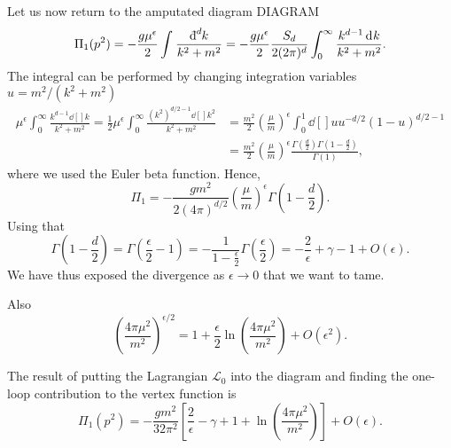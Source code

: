 Let us now return to the amputated diagram DIAGRAM
\begin{equation}
  \Pi_1(p^2) = - \frac{g \mu^\epsilon}{2} \int_{}^{}\frac{\bdd[d]{k}}{k^2+ m^2} = -\frac{g \mu^\epsilon}{2} \frac{S_d}{2 (2\pi)^d} \int_{0}^{\infty}\frac{k^{d-1} \dd[]{k}}{k^2 + m^2}.
\end{equation}
The integral can be performed by changing integration variables $u = m^2 / (k^2 + m^2)$
\begin{align}
  \mu^\epsilon \int_{0}^{\infty}\frac{k^{d-1}\dd[]{k}}{k^2 + m^2} = \frac{1}{2} \mu^\epsilon \int_{0}^{\infty}\frac{(k^2)^{d / 2-1}\dd[]{k^2}}{k^2 + m^2} &= \frac{m^2}{2} (\frac{\mu}{m})^\epsilon \int_{0}^{1}\dd[]{u} u^{-d / 2} (1-u)^{d / 2 - 1} \\
																			  &= \frac{m^2}{2} (\frac{\mu}{m})^\epsilon \frac{\Gamma(\frac{d}{2}) \Gamma(1 - \frac{d}{2})}{\Gamma(1)},
\end{align}
where we used the Euler beta function. Hence,
\begin{equation}
  \Pi_1 = -\frac{g m^2}{2 (4 \pi)^{d/2}} (\frac{\mu}{m})^\epsilon \Gamma(1 - \frac{d}{2}).
\end{equation}
Using that
\begin{equation}
  \Gamma(1- \frac{d}{2}) = \Gamma( \frac{\epsilon}{2} - 1) = -\frac{1}{1 - \frac{\epsilon}{2}} \Gamma(\frac{\epsilon}{2}) = -\frac{2}{\epsilon} + \gamma - 1 + O(\epsilon).
\end{equation}
We have thus exposed the divergence as $\epsilon \to 0$ that we want to tame.

Also
 \begin{equation}
   \left( \frac{4 \pi \mu^2}{m^2} \right)^{\epsilon / 2} = 1 + \frac{\epsilon}{2} \ln(\frac{4\pi \mu^2}{m^2}) + O(\epsilon^2).
\end{equation} 

The result of putting the Lagrangian $\mathscr{L}_0$ into the diagram and finding the one-loop contribution to the vertex function is
\begin{equation}
  \Pi_1(p^2) = -\frac{g m^2}{32 \pi^2} \left[ \frac{2}{\epsilon} - \gamma + 1 + \ln(\frac{4\pi\mu^2}{m^2}) \right] + O(\epsilon).
\end{equation}


